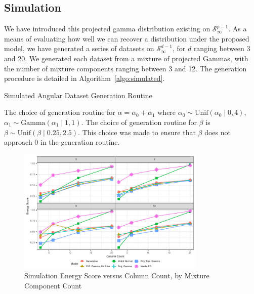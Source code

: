 \subsection{Simulation}
We have introduced this projected gamma distribution existing on $\mathcal{S}_{\infty}^{p-1}$.  As a
  means of evaluating how well we can recover a distribution under the proposed model, we have
  generated a series of datasets on $\mathcal{S}_{\infty}^{d-1}$, for $d$ ranging between 3 and 20.
  We generated each dataset from a mixture of projected Gammas, with the number of mixture components
  ranging between 3 and 12.  The generation procedure is detailed in Algorithm~\ref{algo:simulated}.
  \begin{algorithm}[htb]
    \label{algo:simulated}
    \caption{Simulated Angular Dataset Generation Routine}
  \end{algorithm}
  The choice of generation routine for $\alpha = \alpha_0 + \alpha_1$ where
  $\alpha_0 \sim \text{Unif}(\alpha_0\mid 0,4)$, $\alpha_1\sim \text{Gamma}(\alpha_1\mid 1,1)$.
  The choice of generation routine for $\beta$ is $\beta\sim\text{Unif}(\beta\mid 0.25, 2.5)$.
  This choice was made to ensure that $\beta$ does not approach 0 in the generation routine.

\begin{figure}[h]
  \label{fig:simes}
  \caption{Simulation Energy Score versus Column Count, by Mixture Component Count}
  \centering
  \includegraphics[width=0.8\textwidth]{./images/simulation_es}
\end{figure}

